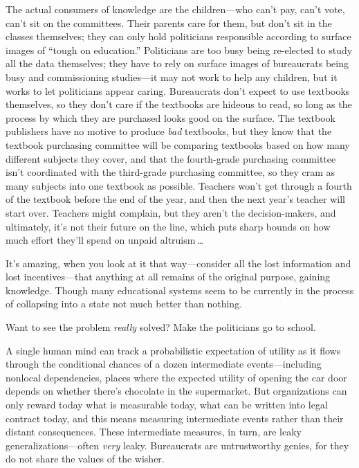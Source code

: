 { The actual consumers of knowledge are the children---who
can't pay, can't vote,
can't sit on the committees. Their parents care for
them, but don't sit in the classes themselves; they can
only hold politicians responsible according to surface images of
``tough on education.'' Politicians
are too busy being re-elected to study all the data themselves; they
have to rely on surface images of bureaucrats being busy and
commissioning studies---it may not work to help any children, but it
works to let politicians appear caring. Bureaucrats
don't expect to use textbooks themselves, so they
don't care if the textbooks are hideous to read, so
long as the process by which they are purchased looks good on the
surface. The textbook publishers have no motive to produce \textit{bad}
textbooks, but they know that the textbook purchasing committee will be
comparing textbooks based on how many different subjects they cover,
and that the fourth-grade purchasing committee isn't
coordinated with the third-grade purchasing committee, so they cram as
many subjects into one textbook as possible. Teachers
won't get through a fourth of the textbook before the
end of the year, and then the next year's teacher will
start over. Teachers might complain, but they aren't
the decision-makers, and ultimately, it's not their
future on the line, which puts sharp bounds on how much effort
they'll spend on unpaid altruism\,\ldots


 It's amazing, when you look at it that
way---consider all the lost information and lost incentives---that
anything at all remains of the original purpose, gaining knowledge.
Though many educational systems seem to be currently in the process of
collapsing into a state not much better than nothing.


 Want to see the problem \textit{really} solved? Make the
politicians go to school.


 A single human mind can track a probabilistic expectation of
utility as it flows through the conditional chances of a dozen
intermediate events---including nonlocal dependencies, places where the
expected utility of opening the car door depends on whether
there's chocolate in the supermarket. But organizations
can only reward today what is measurable today, what can be written
into legal contract today, and this means measuring intermediate events
rather than their distant consequences. These intermediate measures, in
turn, are leaky generalizations---often \textit{very} leaky.
Bureaucrats are untrustworthy genies, for they do not share the values
of the wisher.

}
